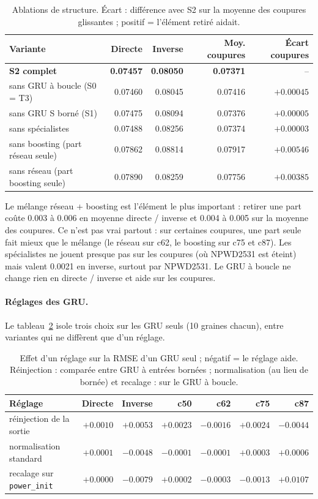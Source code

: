 \documentclass[11pt,a4paper]{article}
\newcommand{\code}[1]{\texttt{#1}}
\begin{document}
\begin{table}[!htb]
\centering\small
\caption{Ablations de structure. Écart : différence avec S2 sur la moyenne des coupures glissantes ; positif = l'élément retiré aidait.}
\label{tab:abl_structure}
\begin{tabular}{l r r r r}
\toprule
Variante & Directe & Inverse & Moy. coupures & Écart coupures \\
\midrule
\textbf{S2 complet} & \textbf{0.07457} & \textbf{0.08050} & \textbf{0.07371} & -- \\
sans GRU à boucle (S0 = T3) & 0.07460 & 0.08045 & 0.07416 & $+0.00045$ \\
sans GRU S borné (S1) & 0.07475 & 0.08094 & 0.07376 & $+0.00005$ \\
sans spécialistes & 0.07488 & 0.08256 & 0.07374 & $+0.00003$ \\
sans boosting (part réseau seule) & 0.07862 & 0.08814 & 0.07917 & $+0.00546$ \\
sans réseau (part boosting seule) & 0.07890 & 0.08259 & 0.07756 & $+0.00385$ \\
\bottomrule
\end{tabular}
\end{table}

Le mélange réseau + boosting est l'élément le plus important : retirer une part coûte 0.003 à 0.006 en moyenne directe / inverse et 0.004 à 0.005 sur la moyenne des coupures. Ce n'est pas vrai partout : sur certaines coupures, une part seule fait mieux que le mélange (le réseau sur c62, le boosting sur c75 et c87). Les spécialistes ne jouent presque pas sur les coupures (où NPWD2531 est éteint) mais valent 0.0021 en inverse, surtout par NPWD2531. Le GRU à boucle ne change rien en directe / inverse et aide sur les coupures.

\paragraph{Réglages des GRU.} Le tableau~\ref{tab:abl_gru} isole trois choix sur les GRU seuls (10 graines chacun), entre variantes qui ne diffèrent que d'un réglage.

\begin{table}[!htb]
\centering\small
\caption{Effet d'un réglage sur la RMSE d'un GRU seul ; négatif = le réglage aide. Réinjection : comparée entre GRU à entrées bornées ; normalisation (au lieu de bornée) et recalage : sur le GRU à boucle.}
\label{tab:abl_gru}
\begin{tabular}{l r r r r r r}
\toprule
Réglage & Directe & Inverse & c50 & c62 & c75 & c87 \\
\midrule
réinjection de la sortie & $+0.0010$ & $+0.0053$ & $+0.0023$ & $-0.0016$ & $+0.0024$ & $-0.0044$ \\
normalisation standard & $+0.0001$ & $-0.0048$ & $-0.0001$ & $-0.0001$ & $+0.0003$ & $+0.0006$ \\
recalage sur \code{power\_init} & $+0.0000$ & $-0.0079$ & $+0.0002$ & $-0.0003$ & $-0.0013$ & $+0.0107$ \\
\bottomrule
\end{tabular}
\end{table}
\end{document}
